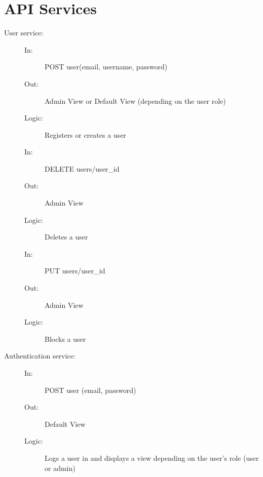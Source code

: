 \documentclass{article}
\begin{document}
\section{API Services}
\begin{description}
    \item [User service:] 
    \begin{description}
        \item[]
        \item[In:] POST user(email, username, password)
        \item[Out:] Admin View or Default View (depending on the user role)
        \item[Logic:] Registers or creates a user
        \item[]
    \end{description}
    \begin{description}
        \item[]
        \item[In:] DELETE users/user\_id
        \item[Out:] Admin View
        \item[Logic:] Deletes a user
        \item[]
    \end{description}
    \begin{description}
        \item[]
        \item[In:] PUT users/user\_id
        \item[Out:] Admin View
        \item[Logic:] Blocks a user
        \item[]
    \end{description}
\end{description}

\begin{description}
    \item [Authentication service:] 
    \begin{description}
        \item[]
        \item[In:] POST user (email, password)
        \item[Out:] Default View
        \item[Logic:] Logs a user in and displays a view depending on the user's role (user or admin)
        \item[]
    \end{description}
\end{description}
\end{document}
